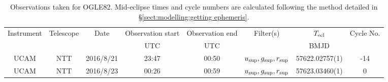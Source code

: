 \begin{table}
	\begin{center}
		\caption{Observations taken for OGLE82. Mid-eclipse times and cycle numbers are calculated following the method detailed in \S\ref{sect:modelling:getting ephemeris}.}
		\label{table:observing:observation logs OGLE82}
		\begin{tabular}{cccccccc}
			\hline
			Instrument & Telescope & Date & Observation start & Observation end & Filter(s) & $T_{\rm ecl}$ & Cycle No. \\
			 &  &  & UTC & UTC &  & BMJD &  \\
			\hline
			\hline
			UCAM & NTT & 2016/8/21 & 23:47 & 00:50 & $u_{\rm sup},g_{\rm sup},r_{\rm sup}$ & 57622.02757(1)                                                                                                            &                                         -14 \\
			UCAM & NTT & 2016/8/23 & 00:26 & 00:59 & $u_{\rm sup},g_{\rm sup},r_{\rm sup}$ & 57623.03460(1)                                                                                                            &                                           0 \\
		   \hline
		\end{tabular}
	\end{center}
\end{table}